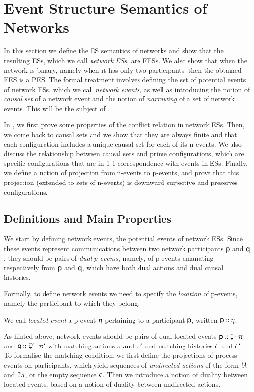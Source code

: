 

\section{Event Structure Semantics of Networks}

In this section we define the ES semantics of networks and show that
the resulting ESs, which we call \emph{network ESs}, are FESs. We also
show that when the network is binary, namely when it has only two
participants, then the obtained FES is a PES.  The formal treatment
involves defining the set of potential events of network ESs, which we
call \emph{network events}, as well as introducing the notion of
\emph{causal set} of a network event and the notion of
\emph{narrowing} of a set of network events.  This will be the subject
of .

In , we first prove some properties
of the conflict relation in network ESs.  Then, we come back to
causal sets and we show that they are always finite and that each
configuration includes a unique causal set for each of its
n-events. We also discuss the relationship between causal sets and
prime configurations, which are specific configurations that are in
1-1 correspondence with events in ESs. Finally, we define a notion of
projection from n-events to p-events, and prove that this projection
(extended to sets of n-events) is downward surjective  and
preserves configurations.



\subsection{Definitions and Main Properties}

We start by defining network events, the potential events
of network ESs.  Since these events represent communications between
two network participants ${\sf p}$ and ${\sf q}$, they should be pairs of \emph
{dual  p-events}, namely, of  p-events  emanating
respectively from ${\sf p}$ and ${\sf q}$, which have both dual actions and
dual causal histories.


Formally, to define network events we need to specify the
\emph{location} of  p-events, namely the participant to which they
belong: 
\begin{definition}
 We call \emph{located event} a  p-event 
$\eta$ pertaining to a participant ${\sf p}$, written ${\sf p}::\eta$.
 \end{definition}
 As hinted above, network events should be pairs of dual located
 events ${\sf p}:: \zeta\cdot\pi$ and
 ${\sf q}:: \zeta'\cdot\pi'$ with matching actions $\pi$ and
 $\pi'$ and matching histories $\zeta$ and $\zeta'$. To formalise
 the matching condition, we first define the projections of process
 events on participants, which yield sequences of \emph{undirected
   actions} of the form $!\lambda$ and $?\lambda$, or the empty sequence
 $\epsilon$.  Then we introduce a notion of duality between located
 events, based on a notion of duality between undirected actions.
 

